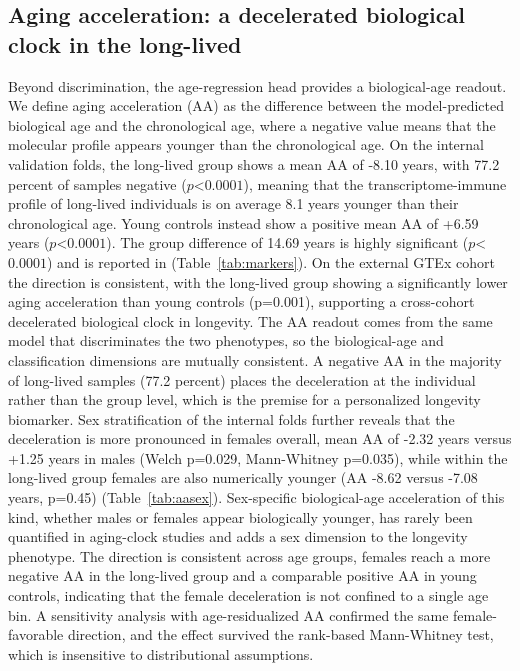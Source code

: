 \documentclass[11pt,a4paper]{article}
\begin{document}
\subsection{Aging acceleration: a decelerated biological clock in the long-lived}\label{sec:resaa}
Beyond discrimination, the age-regression head provides a biological-age readout. We define aging acceleration (AA) as the difference between the model-predicted biological age and the chronological age, where a negative value means that the molecular profile appears younger than the chronological age. On the internal validation folds, the long-lived group shows a mean AA of -8.10 years, with 77.2 percent of samples negative ($p$<$0.0001$), meaning that the transcriptome-immune profile of long-lived individuals is on average 8.1 years younger than their chronological age. Young controls instead show a positive mean AA of +6.59 years ($p$<$0.0001$). The group difference of 14.69 years is highly significant ($p$<$0.0001$) and is reported in (Table~\ref{tab:markers}). On the external GTEx cohort the direction is consistent, with the long-lived group showing a significantly lower aging acceleration than young controls (p=0.001), supporting a cross-cohort decelerated biological clock in longevity. The AA readout comes from the same model that discriminates the two phenotypes, so the biological-age and classification dimensions are mutually consistent. A negative AA in the majority of long-lived samples (77.2 percent) places the deceleration at the individual rather than the group level, which is the premise for a personalized longevity biomarker. Sex stratification of the internal folds further reveals that the deceleration is more pronounced in females overall, mean AA of -2.32 years versus +1.25 years in males (Welch p=0.029, Mann-Whitney p=0.035), while within the long-lived group females are also numerically younger (AA -8.62 versus -7.08 years, p=0.45) (Table~\ref{tab:aasex}). Sex-specific biological-age acceleration of this kind, whether males or females appear biologically younger, has rarely been quantified in aging-clock studies and adds a sex dimension to the longevity phenotype. The direction is consistent across age groups, females reach a more negative AA in the long-lived group and a comparable positive AA in young controls, indicating that the female deceleration is not confined to a single age bin. A sensitivity analysis with age-residualized AA confirmed the same female-favorable direction, and the effect survived the rank-based Mann-Whitney test, which is insensitive to distributional assumptions.
\end{document}
